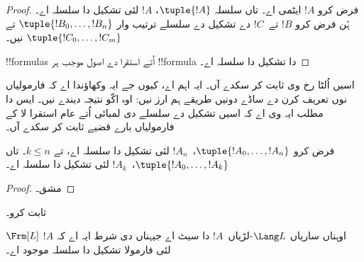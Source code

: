 \documentclass[../../../include/open-logic-section]{subfiles}
\begin{document}
\begin{proof}
فرض کرو $!A$ ایٹمی اے۔ تاں سلسلہ $\tuple{!A}$،
$!A$ لئی تشکیل دا سلسلہ اے۔
%
ہُن فرض کرو $!B$ تے~$!C$ دے تشکیل دے سلسلے
ترتیب وار $\tuple{!B_0,\dotsc,!B_n}$ تے
$\tuple{!C_0,\dotsc,!C_m}$ نیں۔
%
\begin{enumerate}
\end{enumerate}
!!{formula}s اُتے استقرا دے اصول موجب ہر !!{formula}
دا تشکیل دا سلسلہ اے۔
\end{proof}

اسیں اُلٹا رخ وی ثابت کر سکدے آں۔ ایہ اہم اے،
کیوں جے ایہ وکھاؤندا اے کہ فارمولیاں نوں تعریف
کرن دے ساڈے دونیں طریقے ہم ارز نیں: اوہ اکّو
نتیجہ دیندے نیں۔ ایس دا مطلب ایہ وی اے کہ
اسیں تشکیل دے سلسلے دی لمبائی اُتے عام استقرا
لا کے فارمولیاں بارے قضیے ثابت کر سکدے آں۔

\begin{lem}
فرض کرو $\tuple{!A_0,\dotsc,!A_n}$،~$!A_n$ لئی
تشکیل دا سلسلہ اے، تے $k \leq n$۔ تاں
$\tuple{!A_0,\dotsc,!A_k}$،~$!A_k$ لئی
تشکیل دا سلسلہ اے۔
\end{lem}

\begin{proof}
مشق۔
\end{proof}

\begin{prob}
 ثابت کرو۔
\end{prob}

\begin{thm}
$\Frm[L]$ اوہناں ساریاں $\Lang L$-لڑیاں~$!A$
دا سیٹ اے جیہناں دی شرط ایہ اے کہ $!A$ لئی فارمولا تشکیل دا سلسلہ موجود اے۔
\end{thm}
\end{document}
